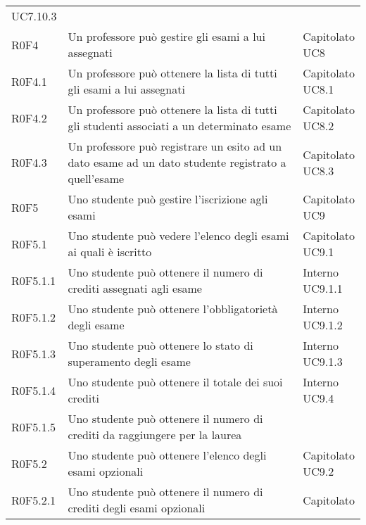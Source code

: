 \documentclass[AnalisiDeiRequisiti.tex]{subfiles}
\begin{document}
\begin{longtable}[H]{p{2cm}p{5.2cm}p{5cm}}
{		UC7.10.3 \\ 	
	} \\
	R0F4 & Un professore può gestire gli esami a lui assegnati & \makecell[tl]{
		Capitolato \\ 
		UC8
	} \\
	R0F4.1 & Un professore può ottenere la lista di tutti gli esami a lui assegnati & \makecell[tl]{
		Capitolato \\ 
		UC8.1
	} \\
	R0F4.2 & Un professore può ottenere la lista di tutti gli studenti associati a un determinato esame & \makecell[tl]{
		Capitolato  \\ 
		UC8.2
	} \\
	R0F4.3 & Un professore può registrare un esito ad un dato esame ad un dato studente registrato a quell'esame & \makecell[tl]{
		Capitolato \\ 
		UC8.3
	} \\
	R0F5 & Uno studente può gestire l'iscrizione agli esami & \makecell[tl]{
		Capitolato \\ 
		UC9
	} \\
	R0F5.1 & Uno studente può vedere l'elenco degli esami ai quali è iscritto & \makecell[tl]{
		Capitolato \\ 
		UC9.1
	} \\
	R0F5.1.1 & Uno studente può ottenere il numero di crediti assegnati agli esame & \makecell[tl]{
		Interno \\ 
		UC9.1.1
	} \\
	R0F5.1.2 & Uno studente può ottenere l'obbligatorietà degli esame & \makecell[tl]{
		Interno \\ 
		UC9.1.2
	} \\
	R0F5.1.3 & Uno studente può ottenere lo stato di superamento degli esame & \makecell[tl]{
		Interno \\ 
		UC9.1.3
	} \\
	R0F5.1.4 & Uno studente può ottenere il totale dei suoi crediti & \makecell[tl]{
		Interno \\ 
		UC9.4
	} \\
	R0F5.1.5 & Uno studente può ottenere il numero di crediti da raggiungere per la laurea & \makecell[tl]{
		Interno
	} \\
	R0F5.2 & Uno studente può ottenere l'elenco degli esami opzionali & \makecell[tl]{
		Capitolato \\ 
		UC9.2
	} \\
	R0F5.2.1 & Uno studente può ottenere il numero di crediti degli esami opzionali & \makecell[tl]{
		Capitolato \\ 
}
\end{longtable}
\end{document}

